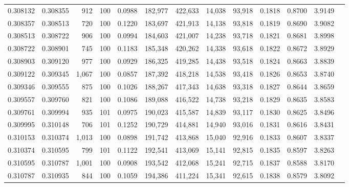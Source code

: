 \begin{tabular}{rrrrrrrrrrrrr}
0.308132 & 0.308355 &   912 & 100 &                                     0.0988 & 182,977 & 422,633 &  14,038 &  93,918 & 0.1818 & 0.8700 & 3.9149 \\
0.308357 & 0.308513 &   720 & 100 &                                     0.1220 & 183,697 & 421,913 &  14,138 &  93,818 & 0.1819 & 0.8690 & 3.9082 \\
0.308513 & 0.308722 &   906 & 100 &                                     0.0994 & 184,603 & 421,007 &  14,238 &  93,718 & 0.1821 & 0.8681 & 3.8998 \\
0.308722 & 0.308901 &   745 & 100 &                                     0.1183 & 185,348 & 420,262 &  14,338 &  93,618 & 0.1822 & 0.8672 & 3.8929 \\
0.308903 & 0.309120 &   977 & 100 &                                     0.0929 & 186,325 & 419,285 &  14,438 &  93,518 & 0.1824 & 0.8663 & 3.8839 \\
0.309122 & 0.309345 & 1,067 & 100 &                                     0.0857 & 187,392 & 418,218 &  14,538 &  93,418 & 0.1826 & 0.8653 & 3.8740 \\
0.309346 & 0.309555 &   875 & 100 &                                     0.1026 & 188,267 & 417,343 &  14,638 &  93,318 & 0.1827 & 0.8644 & 3.8659 \\
0.309557 & 0.309760 &   821 & 100 &                                     0.1086 & 189,088 & 416,522 &  14,738 &  93,218 & 0.1829 & 0.8635 & 3.8583 \\
0.309761 & 0.309994 &   935 & 101 &                                     0.0975 & 190,023 & 415,587 &  14,839 &  93,117 & 0.1830 & 0.8625 & 3.8496 \\
0.309995 & 0.310148 &   706 & 101 &                                     0.1252 & 190,729 & 414,881 &  14,940 &  93,016 & 0.1831 & 0.8616 & 3.8431 \\
0.310153 & 0.310374 & 1,013 & 100 &                                     0.0898 & 191,742 & 413,868 &  15,040 &  92,916 & 0.1833 & 0.8607 & 3.8337 \\
0.310374 & 0.310595 &   799 & 101 &                                     0.1122 & 192,541 & 413,069 &  15,141 &  92,815 & 0.1835 & 0.8597 & 3.8263 \\
0.310595 & 0.310787 & 1,001 & 100 &                                     0.0908 & 193,542 & 412,068 &  15,241 &  92,715 & 0.1837 & 0.8588 & 3.8170 \\
0.310787 & 0.310935 &   844 & 100 &                                     0.1059 & 194,386 & 411,224 &  15,341 &  92,615 & 0.1838 & 0.8579 & 3.8092 \\

\end{tabular}
